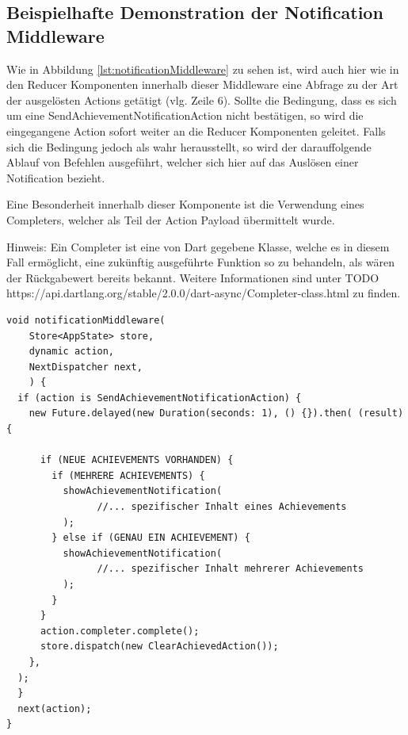 \documentclass[bibliography=totoc,listof=totoc,BCOR=5mm,DIV=12,oneside]{scrbook}
\begin{document}
\subsection{Beispielhafte Demonstration der Notification Middleware}
\par Wie in Abbildung \ref{lst:notificationMiddleware} zu sehen ist, wird auch hier wie in den Reducer Komponenten innerhalb dieser Middleware eine Abfrage zu der Art der ausgelösten Actions getätigt (vlg. Zeile 6). Sollte die Bedingung, dass es sich um eine SendAchievementNotificationAction nicht bestätigen, so wird die eingegangene Action sofort weiter an die Reducer Komponenten geleitet. Falls sich die Bedingung jedoch als wahr herausstellt, so wird der darauffolgende Ablauf von Befehlen ausgeführt, welcher sich hier auf das Auslösen einer Notification bezieht. 
\par Eine Besonderheit innerhalb dieser Komponente ist die Verwendung eines Completers, welcher als Teil der Action Payload übermittelt wurde. 
\par \bigskip Hinweis: Ein Completer ist eine von Dart gegebene Klasse, welche es in diesem Fall ermöglicht, eine zukünftig ausgeführte Funktion so zu behandeln, als wären der Rückgabewert bereits bekannt. Weitere Informationen sind unter 
TODO https://api.dartlang.org/stable/2.0.0/dart-async/Completer-class.html zu finden.

\bigskip
\begin{lstlisting}[caption={Notification Middleware},captionpos=b, label=lst:notificationMiddleware]
void notificationMiddleware(
    Store<AppState> store,
    dynamic action,
    NextDispatcher next,
    ) { 
  if (action is SendAchievementNotificationAction) {
  	new Future.delayed(new Duration(seconds: 1), () {}).then( (result) {
  	
      if (NEUE ACHIEVEMENTS VORHANDEN) {
        if (MEHRERE ACHIEVEMENTS) {
          showAchievementNotification(
				//... spezifischer Inhalt eines Achievements       
          );
        } else if (GENAU EIN ACHIEVEMENT) {
          showAchievementNotification(
				//... spezifischer Inhalt mehrerer Achievements     
          );
        }
      }
      action.completer.complete();
      store.dispatch(new ClearAchievedAction());
    },
  );
  }
  next(action);
}
\end{lstlisting}
\bigskip
\end{document}
